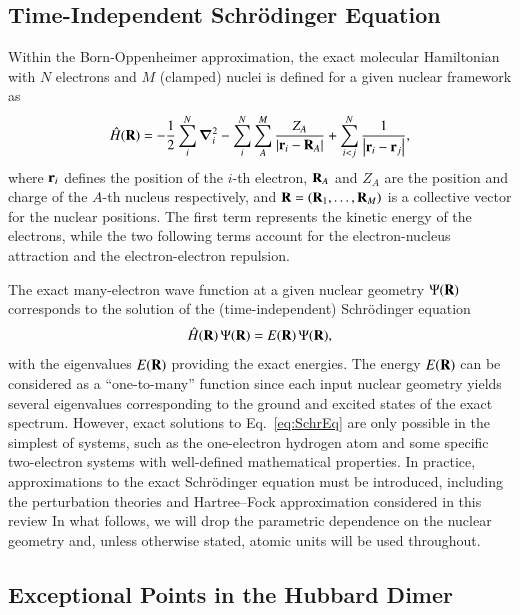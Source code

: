 \documentclass[aps,prb,reprint,noshowkeys,linenumbers,superscriptaddress]{revtex4-1}
\newcommand{\Ne}{N} %
\newcommand{\Nn}{M} %
\newcommand{\hH}{\Hat{H}}
\begin{document}
\subsection{Time-Independent Schr\"odinger Equation}
\label{sec:TDSE}
Within the Born-Oppenheimer approximation, the exact molecular Hamiltonian with $\Ne$ electrons and 
$\Nn$ (clamped) nuclei is defined for a given nuclear framework as
\begin{equation}\label{eq:ExactHamiltonian}
    \hH(\vb{R}) = 
    - \frac{1}{2} \sum_{i}^{\Ne} \grad_i^2 
    - \sum_{i}^{\Ne} \sum_{A}^{\Nn} \frac{Z_A}{\abs{\vb{r}_i-\vb{R}_A}} 
    + \sum_{i<j}^{\Ne}\frac{1}{\abs{\vb{r}_i-\vb{r}_j}},
\end{equation}
where $\vb{r}_i$ defines the position of the $i$-th electron, $\vb{R}_{A}$ and $Z_{A}$ are the position
and charge of the $A$-th nucleus respectively, and $\vb{R} = (\vb{R}_{1}, \dots, \vb{R}_{\Nn})$ is a
collective vector for the nuclear positions.
The first term represents the kinetic energy of the electrons, while 
the two following terms account for the electron-nucleus attraction and the electron-electron repulsion.

The exact many-electron wave function at a given nuclear geometry $\Psi(\vb{R})$ corresponds 
to the solution of the (time-independent) Schr\"{o}dinger equation
\begin{equation} 
    \hH(\vb{R})\, \Psi(\vb{R}) = E(\vb{R})\, \Psi(\vb{R}),
    \label{eq:SchrEq}
\end{equation} 
with the eigenvalues $E(\vb{R})$ providing the exact energies.
The energy $E(\vb{R})$ can be considered as a ``one-to-many'' function since each input nuclear geometry
yields several eigenvalues corresponding to the ground and excited states of the exact spectrum.
However, exact solutions to Eq.~\eqref{eq:SchrEq} are only possible in the simplest of systems, such as 
the one-electron hydrogen atom and some specific two-electron systems with well-defined mathematical 
properties.\cite{Taut_1993,Loos_2009b,Loos_2010e,Loos_2012}
In practice, approximations to the exact Schr\"{o}dinger equation must be introduced, including
the perturbation theories and Hartree--Fock approximation considered in this review
In what follows, we will drop the parametric dependence on the nuclear geometry and, 
unless otherwise stated, atomic units will be used throughout.

\subsection{Exceptional Points in the Hubbard Dimer}
\label{sec:example}
\end{document}
